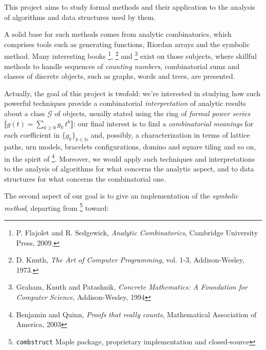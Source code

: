 
\noindent This project aims to study formal methods and their application to
the analysis of algorithms and data structures used by them.

A solid base for such
methods comes from analytic combinatorics, which comprises tools such as
generating functions, Riordan arrays and the symbolic method. Many interesting
books \footnote{P. Flajolet and R. Sedgewick, \emph{Analytic
Combinatorics}, Cambridge University Press, 2009.}, \footnote{D. Knuth,
\emph{The Art of Computer Programming}, vol.  1-3, Addison-Wesley, 1973.} and
\footnote{Graham, Knuth and Patashnik, \emph{Concrete Mathematics: A
Foundation for Computer Science}, Addison-Wesley, 1994} exist on those
subjects, where skillful methods to handle sequences of \emph{counting
numbers}, combinatorial sums and classes of discrete objects, such as graphs,
words and trees, are presented. 

Actually, the goal of this project is twofold: we're interested in studying how such powerful techniques
provide a combinatorial \emph{interpretation} of analytic results about a class
$\mathcal{G}$ of objects, usually stated using the ring of \emph{formal power
series} $\llbracket g(t)=\sum_{k\geq0}{g_{k}\,t^{k}}\rrbracket$: our final
interest is to find a \emph{combinatorial meanings} for each coefficient in
$\lbrace g_{k}\rbrace_{k\in\mathbb{N}}$ and, possibly, a characterization in
terms of lattice paths, urn models, bracelets configurations, domino and square
tiling and so on, in the spirit of \footnote{Benjamin and Quinn,
\emph{Proofs that really counts}, Mathematical Association of America, 2003}.
Moreover, we would apply such techniques and interpretations to the analysis of
algorithms for what concerns the analytic aspect, and to data structures for
what concerns the combinatorial one. 

The second aspect of our goal is to give an implementation of the
\emph{symbolic method}, departing from \footnote{\texttt{combstruct} Maple
package, proprietary implementation and closed-source} toward: 
    
